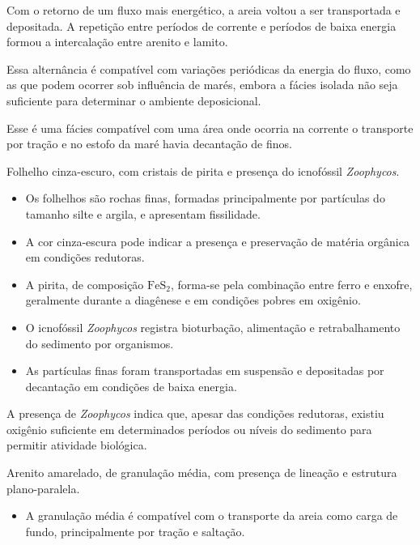 \begin{description}[style=nextline,leftmargin=1.5cm,labelsep=0.5em]
Com o retorno de um fluxo mais energético, a areia voltou a ser transportada
e depositada. A repetição entre períodos de corrente e períodos de baixa
energia formou a intercalação entre arenito e lamito.

Essa alternância é compatível com variações periódicas da energia do fluxo,
como as que podem ocorrer sob influência de marés, embora a fácies isolada
não seja suficiente para determinar o ambiente deposicional.

Esse é uma fácies compatível com uma área onde ocorria na corrente o transporte por tração e no estofo da maré havia decantação de finos.

\item[\textbf{Fácies C}] Folhelho cinza-escuro, com cristais de pirita e
presença do icnofóssil \textit{Zoophycos}.

\begin{itemize}
    \item Os folhelhos são rochas finas, formadas principalmente por partículas
    do tamanho silte e argila, e apresentam fissilidade.

    \item A cor cinza-escura pode indicar a presença e preservação de matéria
    orgânica em condições redutoras.

    \item A pirita, de composição $\mathrm{FeS_2}$, forma-se pela combinação
    entre ferro e enxofre, geralmente durante a diagênese e em condições
    pobres em oxigênio.

    \item O icnofóssil \textit{Zoophycos} registra bioturbação, alimentação e
    retrabalhamento do sedimento por organismos.

    \item As partículas finas foram transportadas em suspensão e depositadas
    por decantação em condições de baixa energia.
\end{itemize}

A presença de \textit{Zoophycos} indica que, apesar das condições redutoras,
existiu oxigênio suficiente em determinados períodos ou níveis do sedimento
para permitir atividade biológica.

\item[\textbf{Fácies D}] Arenito amarelado, de granulação média, com presença
de lineação e estrutura plano-paralela.

\begin{itemize}
    \item A granulação média é compatível com o transporte da areia como carga
    de fundo, principalmente por tração e saltação.


\end{itemize}
\end{description}
